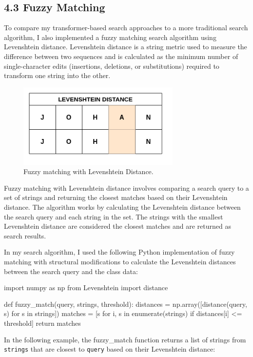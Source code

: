 \documentclass[
	a4paper, %
	10pt, %
	unnumberedsections, %
	twoside, %
]{LTJournalArticle}
\begin{document}
\subsection{4.3 Fuzzy Matching}

To compare my transformer-based search approaches to a more traditional search algorithm, I also implemented a fuzzy matching search algorithm using Levenshtein distance. Levenshtein distance is a string metric used to measure the difference between two sequences and is calculated as the minimum number of single-character edits (insertions, deletions, or substitutions) required to transform one string into the other. 

\begin{figure}[h]
    \includegraphics[width=8.1cm]{fuzzy.png}
    \caption{Fuzzy matching with Levenshtein Distance.}
    \label{fig:fuzzy}
\end{figure}

Fuzzy matching with Levenshtein distance involves comparing a search query to a set of strings and returning the closest matches based on their Levenshtein distance. The algorithm works by calculating the Levenshtein distance between the search query and each string in the set. The strings with the smallest Levenshtein distance are considered the closest matches and are returned as search results.

In my search algorithm, I used the following Python implementation of fuzzy matching with structural modifications to calculate the Levenshtein distances between the search query and the class data:

\begin{python}
	import numpy as np
	from Levenshtein import distance

	def fuzzy_match(query, strings, threshold):
		distances = np.array([distance(query, s)
		 for s in strings])
		matches = [s for i, s in 
		enumerate(strings) if 
		distances[i] <= threshold]
		return matches
\end{python}

In the following example, the fuzzy\_match function returns a list of strings from \texttt{strings} that are closest to \texttt{query} based on their Levenshtein distance:
\end{document}
